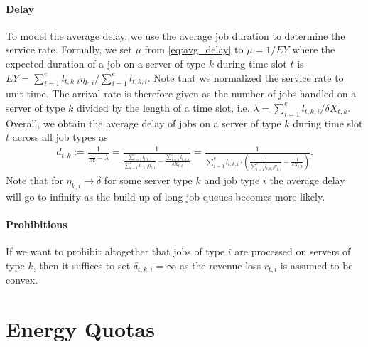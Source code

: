 \paragraph{Delay} To model the average delay, we use the average job duration to determine the service rate. Formally, we set $\mu$ from \autoref{eq:avg_delay} to $\mu = 1 / E Y$ where the expected duration of a job on a server of type $k$ during time slot $t$ is $E Y = \sum_{i=1}^e l_{t,k,i} \eta_{k,i} / \sum_{i=1}^e l_{t,k,i}$. Note that we normalized the service rate to unit time. The arrival rate is therefore given as the number of jobs handled on a server of type $k$ divided by the length of a time slot, i.e. $\lambda = \sum_{i=1}^e l_{t,k,i} / \delta X_{t,k}$. Overall, we obtain the average delay of jobs on a server of type $k$ during time slot $t$ across all job types as \begin{align*}
    d_{t,k} := \frac{1}{\frac{1}{E Y} - \lambda} = \frac{1}{\frac{\sum_{i=1}^e l_{t,k,i}}{\sum_{i=1}^e l_{t,k,i} \eta_{k,i}} - \frac{\sum_{i=1}^e l_{t,k,i}}{\delta X_{t,k}}} = \frac{1}{\sum_{i=1}^e l_{t,k,i} \cdot \left(\frac{1}{\sum_{i=1}^e l_{t,k,i} \eta_{k,i}} - \frac{1}{\delta X_{t,k}}\right)}.
\end{align*} Note that for $\eta_{k,i} \to \delta$ for some server type $k$ and job type $i$ the average delay will go to infinity as the build-up of long job queues becomes more likely.

\paragraph{Prohibitions} If we want to prohibit altogether that jobs of type $i$ are processed on servers of type $k$, then it suffices to set $\delta_{t,k,i} = \infty$ as the revenue loss $r_{t,i}$ is assumed to be convex.

\section{Energy Quotas}\label{section:application:energy_quotas}

